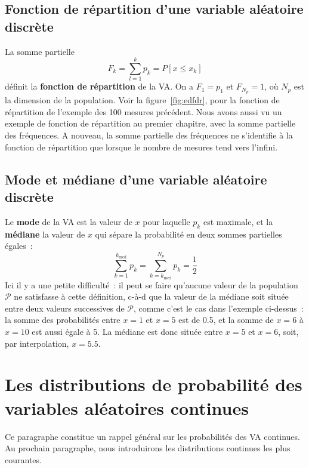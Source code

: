 \subsection{Fonction de répartition d'une variable aléatoire discrète}

La somme partielle
\begin{equation}
F_k=\sum_{l=1}^{k} p_k=P[x\le x_k]
\end{equation}
définit la \textbf{fonction de répartition} de la VA. On a $F_1=p_1$ et $F_{N_p}=1$, où $N_p$ est la dimension de la population. Voir la figure~\ref{fig:edfdr}, pour la fonction de répartition de l'exemple des 100 mesures précédent. Nous avons aussi vu un exemple de fonction de répartition au premier chapitre, avec la somme partielle des fréquences. A nouveau, la somme partielle des fréquences ne s'identifie à la fonction de répartition que lorsque le nombre de mesures tend vers l'infini.

\subsection{Mode et médiane d'une variable aléatoire discrète}

Le \textbf{mode} de la VA est la valeur de $x$ pour laquelle $p_k$ est maximale, et la \textbf{médiane} la valeur de $x$ qui sépare la probabilité en deux sommes partielles égales~:
\begin{equation}
\sum_{k=1}^{k_{\text{med}}}p_k=\sum_{k=k_{\text{med}}}^{N_p}p_k=\frac{1}{2}
\end{equation}
Ici il y a une petite difficulté~: il peut se faire qu'aucune valeur de la population $\mathcal{P}$ ne satisfasse à cette définition, c-à-d que la valeur de la médiane soit située entre deux valeurs successives de $\mathcal{P}$, comme c'est le cas dans l'exemple ci-dessus~: la somme des probabilités entre $x=1$ et $x=5$ est de 0.5, et la somme de $x=6$ à $x=10$ est aussi égale à 5. La médiane est donc située entre $x=5$ et $x=6$, soit, par interpolation, $x=5.5$.

\section{Les distributions de probabilité des variables aléatoires continues}

Ce paragraphe constitue un rappel général sur les probabilités des VA continues. Au prochain paragraphe, nous introduirons les distributions continues les plus courantes.

